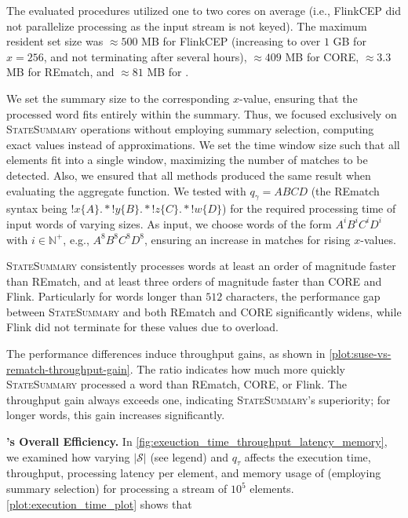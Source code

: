 The evaluated procedures utilized one to two cores on
average (i.e., FlinkCEP did not parallelize processing as the input stream
is not keyed). The maximum resident set size was $\approx500$ MB for
FlinkCEP (increasing to over $1$ GB for $x = 256$, and not terminating after
several hours), $\approx409$ MB for CORE, $\approx 3.3$ MB for REmatch, and
$\approx 81$ MB for \suse{}.

{{We set the summary size to the corresponding $x$-value, ensuring that the
processed word fits entirely within the summary. Thus, we focused
exclusively on \textsc{StateSummary} operations without employing summary
selection, computing exact values instead of approximations. We set the time
window size such that all elements fit into a single window, maximizing the
number of matches to be detected. Also, we ensured that all methods produced
the same result when evaluating the aggregate function.} We tested with
$q_\gamma = ABCD$ (the REmatch syntax being
$!x\{A\}.*!y\{B\}.*!z\{C\}.*!w\{D\}$) for the required processing time of
input words of varying sizes. As input, we choose words of the form
$A^iB^iC^iD^i$ with $i \in \mathbb{N}^+$, e.g., $A^8B^8C^8D^8$, ensuring an increase in matches for rising $x$-values.}

{\textsc{StateSummary} consistently processes words at least an order of magnitude faster than REmatch, and at least three orders of magnitude faster than CORE and Flink. Particularly for words longer than $512$ characters, the performance gap between \textsc{StateSummary} and both REmatch and CORE significantly widens, while Flink did not terminate for these values due to overload.}


The performance differences induce throughput gains, as shown in
\autoref{plot:suse-vs-rematch-throughput-gain}. The ratio indicates how much
more quickly \textsc{StateSummary} processed a word than REmatch, CORE, or Flink. The throughput gain always exceeds one, indicating \textsc{StateSummary}'s superiority; for longer words, this gain increases significantly.


\textbf{\suse{}'s Overall Efficiency.} In
\autoref{fig:exeuction_time_throughput_latency_memory}, we examined how varying
$|\mathcal{S}|$ (see legend) and $q_\tau$ affects the execution time,
throughput, processing latency per element, and memory usage of \suse{} (employing summary selection) for processing a stream of $10^5$ elements.
 \autoref{plot:execution_time_plot} shows that

